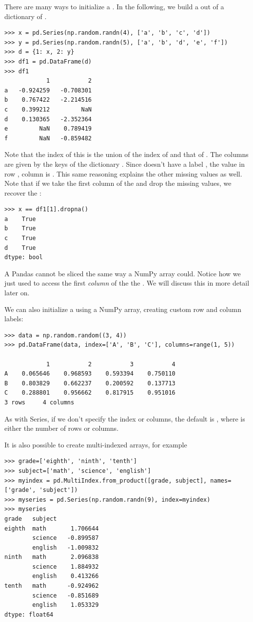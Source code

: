 There are many ways to initialize a . In the following, we build a  out of a
dictionary of .
\begin{lstlisting}
>>> x = pd.Series(np.random.randn(4), ['a', 'b', 'c', 'd'])
>>> y = pd.Series(np.random.randn(5), ['a', 'b', 'd', 'e', 'f'])
>>> d = {1: x, 2: y}
>>> df1 = pd.DataFrame(d)
>>> df1
	        1	        2
a	-0.924259	-0.708301
b	 0.767422	-2.214516
c	 0.399212	      NaN
d	 0.130365	-2.352364
e	      NaN	 0.789419
f	      NaN	-0.859482
\end{lstlisting}
Note that the index of this  is the union of the index of   and that of  .
The columns are given by the keys of the dictionary . Since  doesn't have a label , the
value in row , column  is . This same reasoning explains the other missing values as well.
Note that if we take the first column of the  and drop the missing values, we recover the  :
\begin{lstlisting}
>>> x == df1[1].dropna()
a    True
b    True
c    True
d    True
dtype: bool
\end{lstlisting}

\begin{warn}
A Pandas  cannot be sliced the same way a NumPy array could.
Notice how we just used  to access the first \emph{column} of the the  .
We will discuss this in more detail later on.
\end{warn}

We can also initialize a  using a NumPy array, creating custom row and column labels:
\begin{lstlisting}
>>> data = np.random.random((3, 4))
>>> pd.DataFrame(data, index=['A', 'B', 'C'], columns=range(1, 5))

            1	        2	        3	        4
A	 0.065646	 0.968593	 0.593394	 0.750110
B	 0.803829	 0.662237	 0.200592	 0.137713
C	 0.288801	 0.956662	 0.817915	 0.951016
3 rows     4 columns
\end{lstlisting}
As with Series, if we don't specify the index or columns, the default is , where 
is either the number of rows or columns.

It is also possible to create multi-indexed arrays, for example
\begin{lstlisting}
>>> grade=['eighth', 'ninth', 'tenth']
>>> subject=['math', 'science', 'english']
>>> myindex = pd.MultiIndex.from_product([grade, subject], names=['grade', 'subject'])
>>> myseries = pd.Series(np.random.randn(9), index=myindex)
>>> myseries
grade   subject
eighth  math       1.706644
        science   -0.899587
        english   -1.009832
ninth   math       2.096838
        science    1.884932
        english    0.413266
tenth   math      -0.924962
        science   -0.851689
        english    1.053329
dtype: float64
\end{lstlisting}

